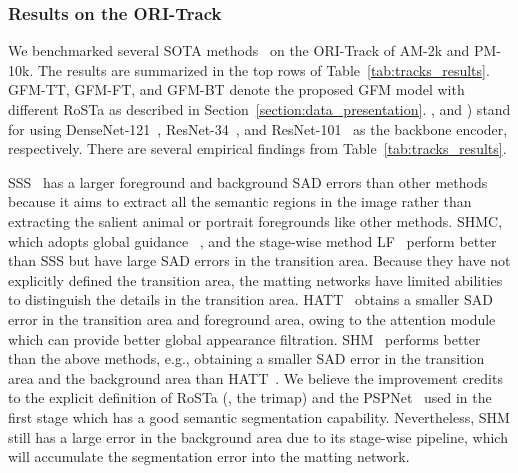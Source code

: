 \documentclass[twocolumn]{svjour3}
\begin{document}
\subsubsection{Results on the ORI-Track} We benchmarked several SOTA methods~\citep{chen2018semantic,zhang2019late,aksoy2018semantic,Qiao_2020_CVPR,liu2020boosting} on the ORI-Track of AM-2k and PM-10k. The results are summarized in the top rows of Table~\ref{tab:tracks_results}. GFM-TT, GFM-FT, and GFM-BT denote the proposed GFM model with different RoSTa as described in Section~\ref{section:data_presentation}. ,  and ) stand for using DenseNet-121~\citep{huang2017densely}, ResNet-34~\citep{he2016deep}, and ResNet-101~\citep{he2016deep} as the backbone encoder, respectively. There are several empirical findings from Table~\ref{tab:tracks_results}.

SSS~\citep{aksoy2018semantic} has a larger foreground and background SAD errors than other methods because it aims to extract all the semantic regions in the image rather than extracting the salient animal or portrait foregrounds like other methods. SHMC, which adopts global guidance~\citep{liu2020boosting} , and the stage-wise method LF~\citep{zhang2019late} perform better than SSS but have large SAD errors in the transition area. Because they have not explicitly defined the transition area, the matting networks have limited abilities to distinguish the details in the transition area. HATT~\citep{Qiao_2020_CVPR} obtains a smaller SAD error in the transition area and foreground area, owing to the attention module which can provide better global appearance filtration. SHM~\citep{chen2018semantic} performs better than the above methods, e.g., obtaining a smaller SAD error in the transition area and the background area than HATT~\citep{Qiao_2020_CVPR}. We believe the improvement credits to the explicit definition of RoSTa (, the trimap) and the PSPNet~\citep{zhao2017pyramid} used in the first stage which has a good semantic segmentation capability. Nevertheless, SHM still has a large error in the background area due to its stage-wise pipeline, which will accumulate the segmentation error into the matting network. 
\end{document}

